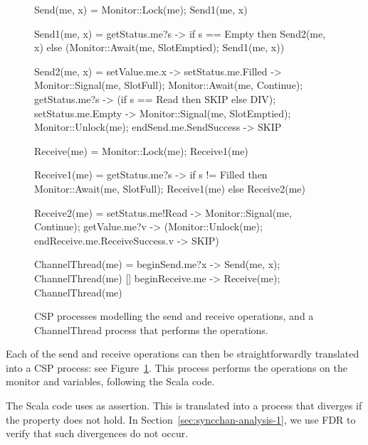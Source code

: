 \begin{figure}
\begin{cspm}
Send(me, x) = Monitor::Lock(me); Send1(me, x)

Send1(me, x) = 
  getStatus.me?s ->
  if s == Empty then Send2(me, x) else (Monitor::Await(me, SlotEmptied); Send1(me, x))

Send2(me, x) = 
  setValue.me.x -> setStatus.me.Filled -> Monitor::Signal(me, SlotFull);	
  Monitor::Await(me, Continue); 
  getStatus.me?s -> (if s == Read then SKIP else DIV);
  setStatus.me.Empty -> Monitor::Signal(me, SlotEmptied);
  Monitor::Unlock(me); endSend.me.SendSuccess -> SKIP

Receive(me) = Monitor::Lock(me); Receive1(me)

Receive1(me) =
  getStatus.me?s -> 
  if s != Filled then Monitor::Await(me, SlotFull); Receive1(me) else Receive2(me)

Receive2(me) = 
  setStatus.me!Read -> Monitor::Signal(me, Continue); 
  getValue.me?v -> (Monitor::Unlock(me); endReceive.me.ReceiveSuccess.v -> SKIP) 

ChannelThread(me) = 
  beginSend.me?x -> Send(me, x); ChannelThread(me)
  [] beginReceive.me -> Receive(me); ChannelThread(me)
\end{cspm}
\caption{CSP processes modelling the {\scalashape send} and {\scalashape
    receive} operations, and a {\scalashape ChannelThread} process that
  performs the operations.}
\label{fig:CSP-send-receive}
\end{figure}


Each of the send and receive operations can then be straightforwardly
translated into a CSP process: see Figure~\ref{fig:CSP-send-receive}.  This
process performs the operations on the monitor and variables, following the
Scala code.  



The Scala code uses as assertion.  This is translated into a process that
diverges if the property does not hold.  In
Section~\ref{sec:syncchan-analysis-1}, we use FDR to verify that such
divergences do not occur.

